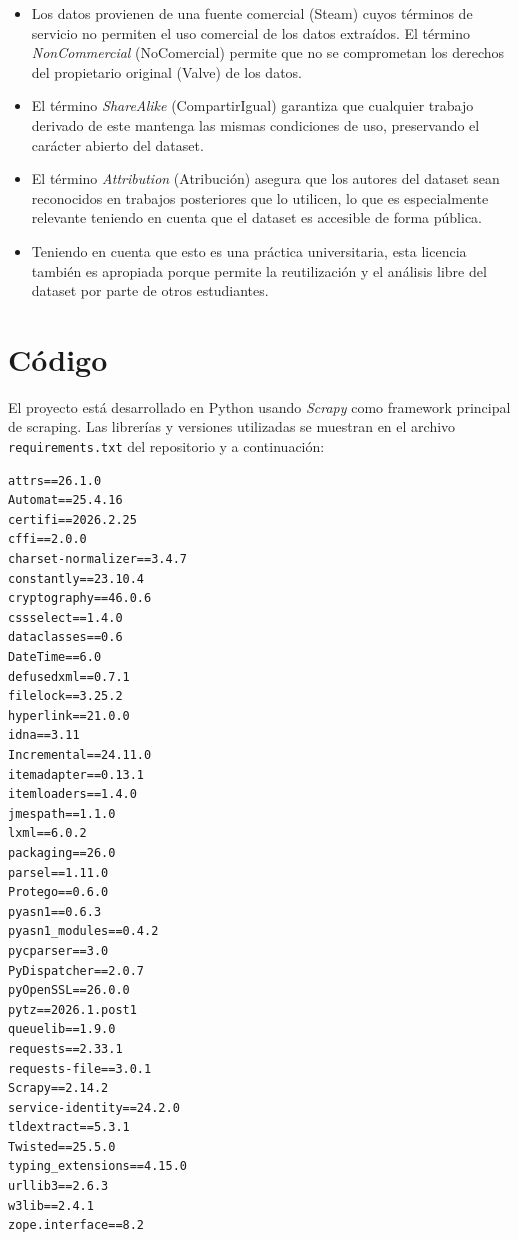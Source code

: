 \documentclass[
]{article}
\begin{document}
\begin{itemize}[itemsep=-4pt]
  \item Los datos provienen de una fuente comercial (Steam) cuyos términos de servicio no permiten el uso comercial de los datos extraídos. El término \textit{NonCommercial} (NoComercial) permite que no se comprometan los derechos del propietario original (Valve) de los datos.
  \item El término \textit{ShareAlike} (CompartirIgual) garantiza que cualquier trabajo derivado de este mantenga las mismas condiciones de uso, preservando el carácter abierto del dataset.
  \item El término \textit{Attribution} (Atribución) asegura que los autores del dataset sean reconocidos en trabajos posteriores que lo utilicen, lo que es especialmente relevante teniendo en cuenta que el dataset es accesible de forma pública.
  \item Teniendo en cuenta que esto es una práctica universitaria, esta licencia también es apropiada porque permite la reutilización y el análisis libre del dataset por parte de otros estudiantes.
\end{itemize}

\section{Código}\label{cuxf3digo}

El proyecto está desarrollado en Python usando \textit{Scrapy} como framework principal de scraping. Las librerías y versiones utilizadas se muestran en el archivo \texttt{requirements.txt} del repositorio y a continuación:

\vspace{0.2cm}
\begin{lstlisting}[numbers=none]
attrs==26.1.0
Automat==25.4.16
certifi==2026.2.25
cffi==2.0.0
charset-normalizer==3.4.7
constantly==23.10.4
cryptography==46.0.6
cssselect==1.4.0
dataclasses==0.6
DateTime==6.0
defusedxml==0.7.1
filelock==3.25.2
hyperlink==21.0.0
idna==3.11
Incremental==24.11.0
itemadapter==0.13.1
itemloaders==1.4.0
jmespath==1.1.0
lxml==6.0.2
packaging==26.0
parsel==1.11.0
Protego==0.6.0
pyasn1==0.6.3
pyasn1_modules==0.4.2
pycparser==3.0
PyDispatcher==2.0.7
pyOpenSSL==26.0.0
pytz==2026.1.post1
queuelib==1.9.0
requests==2.33.1
requests-file==3.0.1
Scrapy==2.14.2
service-identity==24.2.0
tldextract==5.3.1
Twisted==25.5.0
typing_extensions==4.15.0
urllib3==2.6.3
w3lib==2.4.1
zope.interface==8.2
\end{lstlisting}
\end{document}
